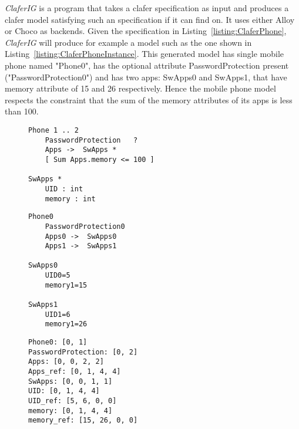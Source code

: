 \documentclass{article}
\newcommand{\listref}[1]{Listing~\ref{#1}}
\begin{document}
\emph{ClaferIG}  is a program that takes a clafer specification as input and produces a clafer model satisfying such an specification if it can find on. It uses either Alloy or Choco as backends. Given the specification in  \listref{listing:ClaferPhone}, \emph{ClaferIG}   will produce for example a model such as the one shown in \listref{listing:ClaferPhoneInstance}.  This generated model has single mobile phone named "Phone0", has the optional attribute PasswordProtection present ("PasswordProtection0") and has two apps: SwApps0 and SwApps1, that have memory attribute of 15 and 26 respectively. Hence the mobile phone model respects the constraint that the sum of the memory attributes of its apps is less than 100. 
\begin{figure}[!t]
\par\noindent
\begin{minipage}[t]{.32\textwidth}
\begin{lstlisting}[language=clafer, caption=A specification of a mobile phone and its apps in clafer.]
Phone 1 .. 2
	PasswordProtection 	 ?
	Apps ->  SwApps *
	[ Sum Apps.memory <= 100 ]
	
SwApps * 
	UID : int
	memory : int
\end{lstlisting}%
 \label{listing:ClaferPhone}
\end{minipage}%
\hfill
\begin{minipage}[t]{.32\textwidth}
\begin{lstlisting}[language=clafer, caption=A generated model of a mobile phone and its apps in clafer from the specification in Listing 1.]
Phone0
	PasswordProtection0
	Apps0 ->  SwApps0
	Apps1 ->  SwApps1
	
SwApps0 
	UID0=5
	memory1=15

SwApps1 
	UID1=6
	memory1=26
\end{lstlisting}%
 \label{listing:ClaferPhoneInstance}
\end{minipage}%
\hfill
\begin{minipage}[t]{.32\textwidth}
\begin{lstlisting}[language=clafer, caption=The integer variables associated with each clafer in Z3 and corresponding to Listing 2.]
Phone0: [0, 1]
PasswordProtection: [0, 2]
Apps: [0, 0, 2, 2]
Apps_ref: [0, 1, 4, 4]
SwApps: [0, 0, 1, 1]
UID: [0, 1, 4, 4]
UID_ref: [5, 6, 0, 0]
memory: [0, 1, 4, 4]
memory_ref: [15, 26, 0, 0]
\end{lstlisting}%
\label{listing:ClaferPhoneZ3}
\end{minipage}%
\end{figure}
\end{document}
